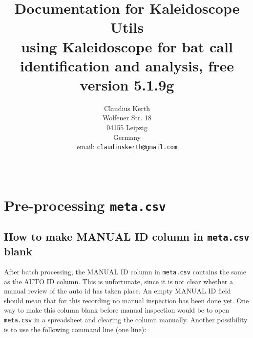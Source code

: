 \documentclass[English, 11pt, twoside, authoryear]{article}
\begin{document}
%
\title{ Documentation for \textsf{Kaleidoscope Utils}  \\
\vspace{20pt}
\normalsize{using \textsf{Kaleidoscope} for bat call identification and analysis, free version 5.1.9g}\vspace{100pt}}

%
%
\author{Claudius Kerth\\Wolfener Str. 18\\04155 Leipzig\\Germany\\email: \texttt{claudiuskerth@gmail.com}}
%
%
\date{~} %
%
%
%
%
%
%
\maketitle
%

\thispagestyle{empty} %
%
%
\tableofcontents %
%
%
\clearpage %
\setcounter{page}{1} %
%
%
%
%
%
\onecolumn


%
%
%
\section{Pre-processing \texttt{meta.csv}}

%
%
%
\subsection{How to make MANUAL ID column in \texttt{meta.csv} blank}
%
%
%
After batch processing, the MANUAL ID column in \texttt{meta.csv} contains the same as the AUTO ID column. This is unfortunate, since it is not clear whether a manual review of the auto id has taken place. An empty MANUAL ID field should mean that for this recording no manual inspection has been done yet. One way to make this column blank before manual inspection would be to open \texttt{meta.csv} in a spreadsheet and clearing the column manually. Another possibility is to use the following command line (one line):
\end{document}
